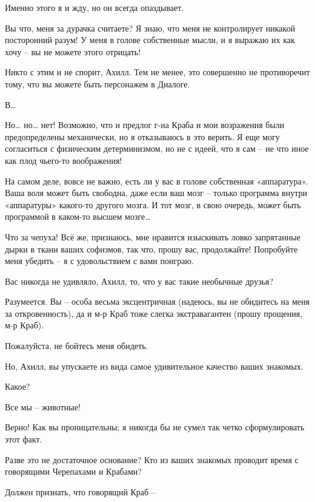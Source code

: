 \documentclass[../main.tex]{subfiles}
\begin{document}
\begin{dialogue}
 Именно этого я и жду, но он всегда опаздывает.

 Вы что, меня за дурачка считаете? Я знаю, что меня не контролирует никакой посторонний разум! У меня в голове собственные мысли, и я выражаю их как хочу \--- вы не можете этого отрицать!

 Никто с этим и не спорит, Ахилл. Тем не менее, это совершенно не противоречит тому, что вы можете быть персонажем в Диалоге.

 В\ldots{}

 Но\ldots{} но\ldots{} нет! Возможно, что и предлог г-на Краба и мои возражения были предопределены механически, но я отказываюсь в это верить. Я еще могу согласиться с физическим детерминизмом, но не с идеей, что я сам \--- не что иное как плод чьего-то воображения!

 На самом деле, вовсе не важно, есть ли у вас в голове собственная «аппаратура». Ваша воля может быть свободна, даже если ваш мозг \--- только программа внутри «аппаратуры» какого-то другого мозга. И тот мозг, в свою очередь, может быть программой в каком-то высшем мозге\ldots{}

 Что за чепуха! Всё же, признаюсь, мне нравится изыскивать ловко запрятанные дырки в ткани ваших софизмов, так что, прошу вас, продолжайте! Попробуйте меня убедить \--- я с удовольствием с вами поиграю.

 Вас никогда не удивляло, Ахилл, то, что у вас такие необычные друзья?

 Разумеется. Вы \--- особа весьма эксцентричная (надеюсь, вы не обидитесь на меня за откровенность), да и м-р Краб тоже слегка экстравагантен (прошу прощения, м-р Краб).

 Пожалуйста, не бойтесь меня обидеть.

 Но, Ахилл, вы упускаете из вида самое удивительное качество ваших знакомых.

 Какое?

 Все мы \--- животные!

 Верно! Как вы проницательны; я никогда бы не сумел так четко сформулировать этот факт.

 Разве это не достаточное основание? Кто из ваших знакомых проводит время с говорящими Черепахами и Крабами?

 Должен признать, что говорящий Краб \---


\end{dialogue}
\end{document}
